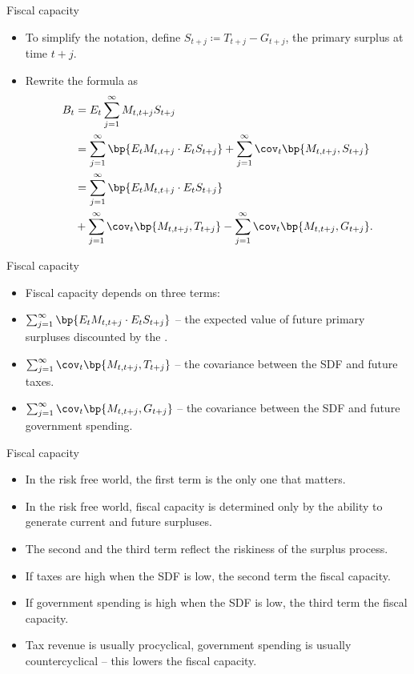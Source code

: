 \documentclass[11pt,xcolor={dvipsnames},aspectratio=159,hyperref={pdftex,pdfpagemode=UseNone,hidelinks,pdfdisplaydoctitle=true},usepdftitle=false]{beamer}
\begin{document}
\begin{frame}{Fiscal capacity}  
    \begin{itemize}
        \item To simplify the notation, define $S_{t+j}\coloneq T_{t+j}-G_{t+j}$, the primary surplus at time $t+j$.
        \item Rewrite the formula as 
        \begin{align*}
                B_t & = E_t \sum_{j=1}^\infty M_{t,t+j} S_{t+j}  \\
                & = \sum_{j=1}^\infty \bp{ E_t M_{t,t+j} \cdot E_t S_{t+j}} + \sum_{j=1}^\infty \cov_t \bp{M_{t,t+j}, S_{t+j}} \\
                & = \sum_{j=1}^\infty \bp{ E_t M_{t,t+j} \cdot E_t S_{t+j}}  \\
                &+ \sum_{j=1}^\infty \cov_t \bp{M_{t,t+j}, T_{t+j}} - \sum_{j=1}^\infty \cov_t \bp{M_{t,t+j}, G_{t+j}}.
        \end{align*}
     \end{itemize}
\end{frame}

\begin{frame}{Fiscal capacity}  
    \begin{itemize}
        \item Fiscal capacity depends on three terms:
        \item $\sum_{j=1}^\infty \bp{ E_t M_{t,t+j} \cdot E_t S_{t+j}}$ -- the expected value of future primary surpluses discounted by the .
        \item $\sum_{j=1}^\infty \cov_t \bp{M_{t,t+j}, T_{t+j}}$ -- the covariance between the SDF and future taxes.
        \item $\sum_{j=1}^\infty \cov_t \bp{M_{t,t+j}, G_{t+j}}$ -- the covariance between the SDF and future government spending.
     \end{itemize}
\end{frame}

\begin{frame}{Fiscal capacity}  
    \begin{itemize}
        \item In the risk free world, the first term is the only one that matters.
        \item In the risk free world, fiscal capacity is determined only by the ability to generate current and future surpluses.
        \item The second and the third term reflect
        the riskiness of the surplus process.
        \item If taxes are high when the SDF is low, the second term  the fiscal capacity.
        \item If government spending is high when the SDF is low, the third term  the fiscal capacity.
        \item Tax revenue is usually procyclical, government spending is usually countercyclical -- this lowers the fiscal capacity.
     \end{itemize}
\end{frame}
\end{document}
